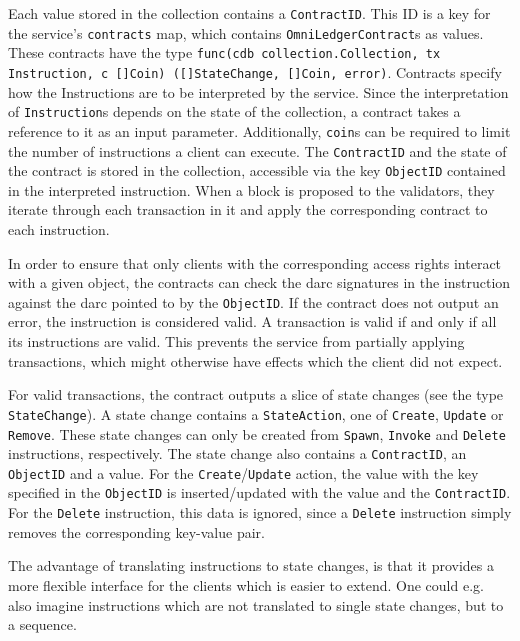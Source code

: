 \documentclass[11pt, a4paper, twoside, openright]{article} %
\begin{document}
Each value stored in the collection contains a \texttt{ContractID}.
This ID is a key for the service's \texttt{contracts} map,
which contains \texttt{OmniLedgerContract}s as values.
These contracts have the type
\texttt{func(cdb collection.Collection, tx Instruction, c []Coin) ([]StateChange, []Coin, error)}.
Contracts specify how the Instructions are to be interpreted by
the service. Since the interpretation of \texttt{Instruction}s depends on the
state of the collection, a contract takes a reference to it as an
input parameter. Additionally, \texttt{coin}s can be required to limit the
number of instructions a client can execute.
The \texttt{ContractID} and the state of the contract is stored in the
collection, accessible via the key \texttt{ObjectID} contained in
the interpreted instruction.
When a block is proposed to the validators, they iterate through each
transaction in it and apply the corresponding contract to each instruction.

In order to ensure that only clients with the corresponding access rights
interact with a given object, the contracts can check the darc signatures in
the instruction against the darc pointed to by the \texttt{ObjectID}.
If the contract does not output an error, the instruction is considered valid.
A transaction is valid if and only if all its instructions are
valid. This prevents the service from partially applying
transactions, which might otherwise have effects which the client did not
expect.

For valid transactions, the contract outputs a slice of
state changes (see the type \texttt{StateChange}).
A state change contains a \texttt{StateAction},
one of \texttt{Create}, \texttt{Update} or \texttt{Remove}. These
state changes can only be created from \texttt{Spawn}, \texttt{Invoke}
and \texttt{Delete} instructions, respectively.
The state change also contains a \texttt{ContractID}, an
\texttt{ObjectID} and a value. For the \texttt{Create}/\texttt{Update}
action, the value with the key specified in the \texttt{ObjectID} is
inserted/updated with the value and the \texttt{ContractID}.
For the \texttt{Delete} instruction, this data is ignored, since a
\texttt{Delete} instruction simply removes the corresponding key-value pair.

The advantage of translating instructions to state changes, is that it provides
a more flexible interface for the clients which is easier to extend. One could
e.g. also imagine instructions which are not translated to single state
changes, but to a sequence.\\
\end{document}
